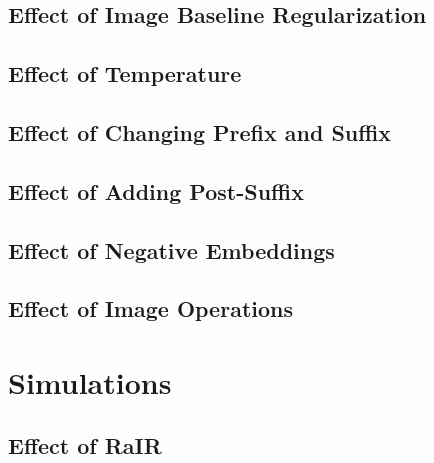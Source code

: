 \subsection{Effect of Image Baseline Regularization}
\label{sec:reg-beta}


\subsection{Effect of Temperature}
\label{sec:reg-temperature}


\subsection{Effect of Changing Prefix and Suffix}
\label{sec:prefix-suffix}


\subsection{Effect of Adding Post-Suffix}
\label{sec:post-suffix}


\subsection{Effect of Negative Embeddings}
\label{sec:negative-embeddings}


\subsection{Effect of Image Operations}
\label{sec:image-operations}



\section{Simulations}
\label{sec:simulations}


\subsection{Effect of RaIR}
\label{sec:effect-rair}

